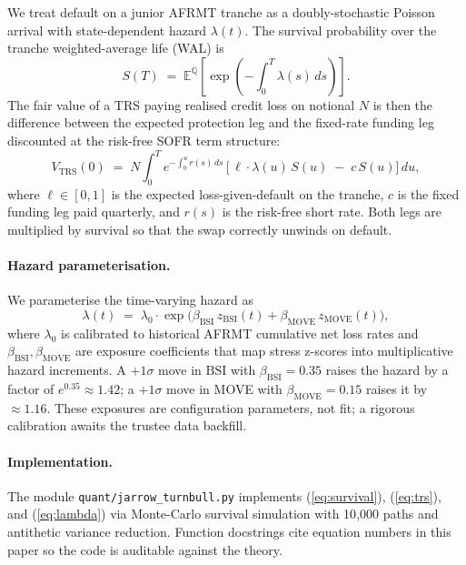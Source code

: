 \documentclass[11pt,letterpaper]{article}
\newcommand{\bsi}{\text{BSI}}
\newcommand{\move}{\text{MOVE}}
\newcommand{\z}{z}
\begin{document}
We treat default on a junior AFRMT tranche as a doubly-stochastic
Poisson arrival with state-dependent hazard $\lambda(t)$. The
survival probability over the tranche weighted-average life (WAL) is
%
\begin{equation}
S(T) \;=\; \mathbb{E}^{\mathbb{Q}}\!\left[\exp\!\left(
-\int_0^T \lambda(s)\, ds
\right)\right].
\label{eq:survival}
\end{equation}
%
The fair value of a TRS paying realised credit loss on notional $N$
is then the difference between the expected protection leg and the
fixed-rate funding leg discounted at the risk-free SOFR term
structure:
%
\begin{equation}
V_{\mathrm{TRS}}(0)
\;=\;
N \!\!\int_0^T\!\!\! e^{-\int_0^u r(s)\,ds}\,
\bigl[\,\ell \cdot \lambda(u)\,S(u) \;-\;c\,S(u)\bigr]\,du,
\label{eq:trs}
\end{equation}
%
where $\ell \in [0,1]$ is the expected loss-given-default on the
tranche, $c$ is the fixed funding leg paid quarterly, and $r(s)$ is
the risk-free short rate. Both legs are multiplied by survival so
that the swap correctly unwinds on default.

\paragraph{Hazard parameterisation.}
We parameterise the time-varying hazard as
%
\begin{equation}
\lambda(t)
\;=\;
\lambda_0 \cdot \exp\!\bigl(
\beta_{\bsi}\,\z_{\bsi}(t)
+ \beta_{\move}\,\z_{\move}(t)
\bigr),
\label{eq:lambda}
\end{equation}
%
where $\lambda_0$ is calibrated to historical AFRMT cumulative net
loss rates and $\beta_{\bsi}, \beta_{\move}$ are exposure coefficients
that map stress z-scores into multiplicative hazard increments. A
$+1\sigma$ move in $\bsi$ with $\beta_{\bsi} = 0.35$ raises the
hazard by a factor of $e^{0.35} \approx 1.42$; a $+1\sigma$ move in
MOVE with $\beta_{\move} = 0.15$ raises it by $\approx 1.16$. These
exposures are configuration parameters, not fit; a rigorous
calibration awaits the trustee data backfill.

\paragraph{Implementation.}
The module \texttt{quant/jarrow\_turnbull.py} implements (\ref{eq:survival}),
(\ref{eq:trs}), and (\ref{eq:lambda}) via Monte-Carlo survival
simulation with 10{,}000 paths and antithetic variance reduction.
Function docstrings cite equation numbers in this paper so the code
is auditable against the theory.
\end{document}
